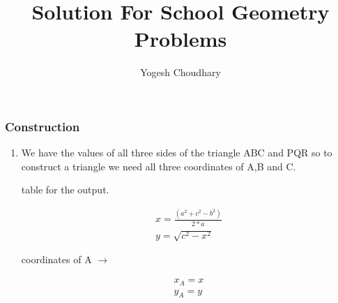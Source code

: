 \documentclass{beamer}
\title{\textbf{Solution For School Geometry Problems}}
\author{Yogesh Choudhary}
\begin{document}
	
	\def\inputGnumericTable{}
	\frame{
			\titlepage
		  }
	  
        
       \begin{frame}
       		\frametitle{Construction}
       	\begin{enumerate}
       		\item 
       	
       		\begin{multicols}{2}
       				We have the values of all three sides of the triangle ABC and PQR so to construct  a triangle we need all three coordinates of A,B and C.
       			
       			
       			
       		\begin{table}[h!]
       			\begin{center}
       				\caption{table for the output.}
       				\label{tab:table1}
       				
       			\end{center}
       		\end{table}
       	
       		\begin{align}
       		x = \frac{\left(a^2 + c^2 - b^2\right)}{2*a}
       		\\
       		y=\sqrt{c^2 - x^2}
       		\end{align}
       		
       		coordinates of A $\to$
       		
       		\begin{align}
       		x_A = x       		
       		\\
       		y_A = y
       		\end{align}	
       		\end{multicols}			
       	\end{enumerate}	
       \end{frame}
	  	
\end{document}
